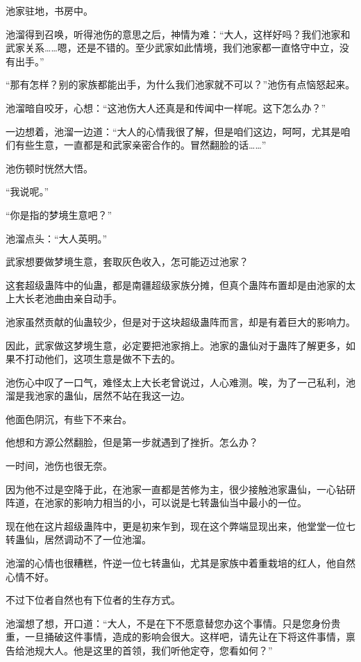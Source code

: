 
\begin{this_body}



池家驻地，书房中。

池溜得到召唤，听得池伤的意思之后，神情为难：“大人，这样好吗？我们池家和武家关系……嗯，还是不错的。至少武家如此情境，我们池家都一直恪守中立，没有出手。”

“那有怎样？别的家族都能出手，为什么我们池家就不可以？”池伤有点恼怒起来。

池溜暗自咬牙，心想：“这池伤大人还真是和传闻中一样呢。这下怎么办？”

一边想着，池溜一边道：“大人的心情我很了解，但是咱们这边，呵呵，尤其是咱们有些生意，一直都是和武家亲密合作的。冒然翻脸的话……”

池伤顿时恍然大悟。

“我说呢。”

“你是指的梦境生意吧？”

池溜点头：“大人英明。”

武家想要做梦境生意，套取灰色收入，怎可能迈过池家？

这套超级蛊阵中的仙蛊，都是南疆超级家族分摊，但真个蛊阵布置却是由池家的太上大长老池曲由亲自动手。

池家虽然贡献的仙蛊较少，但是对于这块超级蛊阵而言，却是有着巨大的影响力。

因此，武家做这梦境生意，必定要把池家捎上。池家的蛊仙对于蛊阵了解更多，如果不打动他们，这项生意是做不下去的。

池伤心中叹了一口气，难怪太上大长老曾说过，人心难测。唉，为了一己私利，池溜是我池家的蛊仙，居然不站在我这一边。

他面色阴沉，有些下不来台。

他想和方源公然翻脸，但是第一步就遇到了挫折。怎么办？

一时间，池伤也很无奈。

因为他不过是空降于此，在池家一直都是苦修为主，很少接触池家蛊仙，一心钻研阵道，在池家的影响力相当的小，可以说是七转蛊仙当中最小的一位。

现在他在这片超级蛊阵中，更是初来乍到，现在这个弊端显现出来，他堂堂一位七转蛊仙，居然调动不了一位池溜。

池溜的心情也很糟糕，忤逆一位七转蛊仙，尤其是家族中着重栽培的红人，他自然心情不好。

不过下位者自然也有下位者的生存方式。

池溜想了想，开口道：“大人，不是在下不愿意替您办这个事情。只是您身份贵重，一旦捅破这件事情，造成的影响会很大。这样吧，请先让在下将这件事情，禀告给池规大人。他是这里的首领，我们听他定夺，您看如何？”


\end{this_body}
